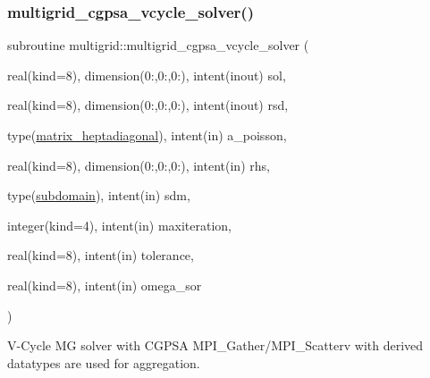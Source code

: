 \subsubsection{\texorpdfstring{multigrid\+\_\+cgpsa\+\_\+vcycle\+\_\+solver()}{multigrid\_cgpsa\_vcycle\_solver()}}
{\footnotesize\ttfamily subroutine multigrid\+::multigrid\+\_\+cgpsa\+\_\+vcycle\+\_\+solver (\begin{DoxyParamCaption}\item[{real(kind=8), dimension(0\+:,0\+:,0\+:), intent(inout)}]{sol,  }\item[{real(kind=8), dimension(0\+:,0\+:,0\+:), intent(inout)}]{rsd,  }\item[{type(\hyperlink{structmatrix_1_1matrix__heptadiagonal}{matrix\+\_\+heptadiagonal}), intent(in)}]{a\+\_\+poisson,  }\item[{real(kind=8), dimension(0\+:,0\+:,0\+:), intent(in)}]{rhs,  }\item[{type(\hyperlink{structgeometry_1_1subdomain}{subdomain}), intent(in)}]{sdm,  }\item[{integer(kind=4), intent(in)}]{maxiteration,  }\item[{real(kind=8), intent(in)}]{tolerance,  }\item[{real(kind=8), intent(in)}]{omega\+\_\+sor }\end{DoxyParamCaption})}



V-\/\+Cycle MG solver with C\+G\+P\+SA  M\+P\+I\+\_\+\+Gather/\+M\+P\+I\+\_\+\+Scatterv with derived datatypes are used for aggregation. 


